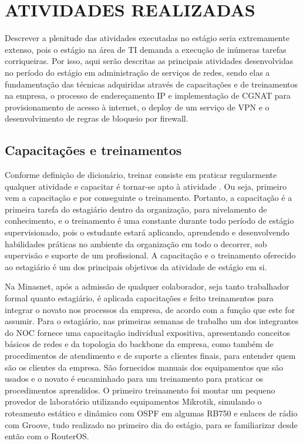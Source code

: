\chapter{ATIVIDADES REALIZADAS}

    Descrever a plenitude das atividades executadas no estágio seria extremamente extenso, pois o estágio na área de TI demanda a execução de inúmeras tarefas corriqueiras. Por isso, aqui serão descritas as principais atividades desenvolvidas no período do estágio em administração de serviços de redes, sendo elas a fundamentação das técnicas adquiridas através de capacitações e de treinamentos na empresa, o processo de endereçamento IP e implementação de CGNAT para provisionamento de acesso à internet, o deploy de um serviço de VPN e o desenvolvimento de regras de bloqueio por firewall. 

\section{Capacitações e treinamentos}

    Conforme definição de dicionário, treinar consiste em praticar regularmente qualquer atividade e capacitar é tornar-se apto à atividade \cite{michaelis2015}. Ou seja, primeiro vem a capacitação e por conseguinte o treinamento. Portanto, a capacitação é a primeira tarefa do estagiário dentro da organização, para nivelamento de conhecimento, e o treinamento é uma constante durante todo período de estágio supervisionado, pois o estudante estará aplicando, aprendendo e desenvolvendo habilidades práticas no ambiente da organização em todo o decorrer, sob supervisão e suporte de um profissional. A capacitação e o treinamento oferecido ao estagiário é um dos principais objetivos da atividade de estágio em si.
    
    Na Minasnet, após a admissão de qualquer colaborador, seja tanto trabalhador formal quanto estagiário, é aplicada capacitações e feito treinamentos para integrar o novato nos processos da empresa, de acordo com a função que este for assumir. Para o estagiário, nas primeiras semanas de trabalho um dos integrantes do NOC fornece uma capacitação individual expositiva, apresentando conceitos básicos de redes e da topologia do backbone da empresa, como também de procedimentos de atendimento e de suporte a clientes finais, para entender quem são os clientes da empresa. São fornecidos manuais dos equipamentos que são usados e o novato é encaminhado para um treinamento para praticar os procedimentos aprendidos. O primeiro treinamento foi montar um pequeno provedor de laboratório utilizando equipamentos Mikrotik, simulando o roteamento estático e dinâmico com OSPF em algumas RB750 e enlaces de rádio com Groove, tudo realizado no primeiro dia do estágio, para se familiarizar desde então com o RouterOS.
    
